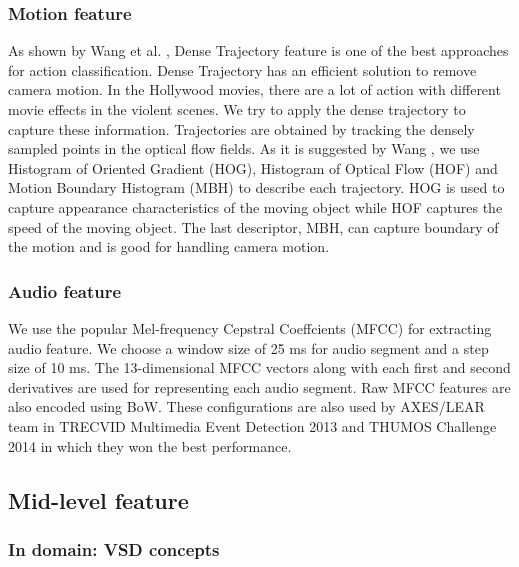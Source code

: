 \documentclass[twocolumn]{bmcart}%
\begin{document}
\subsubsection{Motion feature}
As shown by Wang et al. \cite{wang2013action}, Dense Trajectory feature is one of the best approaches for action classification. Dense Trajectory has an efficient solution to remove camera motion. In the Hollywood movies, there are a lot of action with different movie effects in the violent scenes. We try to apply the dense trajectory  to capture these information. Trajectories are obtained by tracking the densely sampled points in the optical flow fields. As it is suggested by Wang \cite{wang2013action}, we use Histogram of Oriented Gradient (HOG), Histogram of Optical Flow (HOF) and Motion Boundary Histogram (MBH) to describe each trajectory. HOG is used to capture appearance characteristics of the moving object while HOF captures the speed of the moving object. The last descriptor, MBH, can capture boundary of the motion and is good for handling camera motion.

\subsubsection{Audio feature}
We use the popular Mel-frequency Cepstral Coeffcients (MFCC) \cite{rabiner2007introduction} for extracting audio feature. We choose a window size of 25 ms for audio segment and a step size of 10 ms. The 13-dimensional MFCC vectors along with each first and second derivatives are used for representing each audio segment. Raw MFCC features are also encoded using BoW. These configurations are also used by AXES/LEAR team in TRECVID Multimedia Event Detection 2013 \cite{aly2013axes} and THUMOS Challenge 2014 \cite{oneata2014lear} in which they won the best performance.

\subsection{Mid-level feature}
\subsubsection{In domain: VSD concepts}
\end{document}
